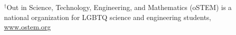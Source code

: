 \documentclass[letterpaper]{deedy-resume} %
\begin{document}
{\begin{itemize}
\end{itemize}



{\small $^\dag$Out in Science, Technology, Engineering, and Mathematics (oSTEM) is a national organization for LGBTQ science and engineering students, \href{www.ostem.org}{www.ostem.org}}





  





  
  
}
\end{document}
